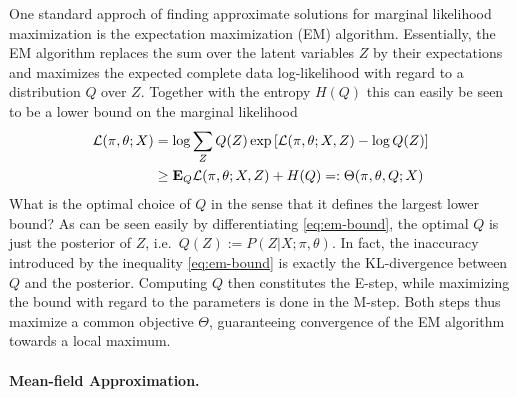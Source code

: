 \documentclass{article}
\newcommand{\E}{{\bf E}}
\newcommand{\loglike}{{\mathcal L}}
\begin{document}
One standard approch of finding approximate solutions for marginal likelihood maximization is the expectation maximization (EM) algorithm. Essentially, the EM algorithm replaces the sum over the latent variables $Z$ by their expectations and maximizes the expected complete data log-likelihood with regard to a distribution $Q$ over $Z$. Together with the entropy $H(Q)$ this can easily be seen to be a lower bound on the marginal likelihood 
\begin{align}
\label{eq:em-bound}
 \loglike(\pi, \theta; X) \nonumber 
& = \log \sum_Z Q(Z) \exp\left[ \loglike(\pi, \theta; X, Z) - \log Q(Z) \right] \\ 
& \ge\E_Q \loglike(\pi, \theta; X, Z) + H(Q) =: \Theta(\pi, \theta, Q; X)
\end{align}
What is the optimal choice of $Q$ in the sense that it defines the largest lower bound? As can be seen easily by differentiating \eqref{eq:em-bound}, the optimal $Q$ is just the posterior of $Z$, i.e.~$Q(Z) := P(Z| X; \pi, \theta)$. In fact, the inaccuracy introduced by the inequality \eqref{eq:em-bound} is exactly the KL-divergence between $Q$ and the posterior. Computing $Q$ then constitutes the E-step, while maximizing the bound with regard to the parameters is done in the M-step. Both steps thus maximize a common objective $\Theta$, guaranteeing  convergence of the EM algorithm towards a local maximum. 

\paragraph{Mean-field Approximation.}  
\end{document}

